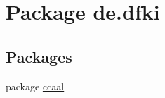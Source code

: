 \hypertarget{namespacede_1_1dfki}{\section{Package de.\-dfki}
\label{namespacede_1_1dfki}
}
\subsection*{Packages}
\begin{DoxyCompactItemize}
\item 
package \hyperlink{namespacede_1_1dfki_1_1ccaal}{ccaal}
\end{DoxyCompactItemize}
